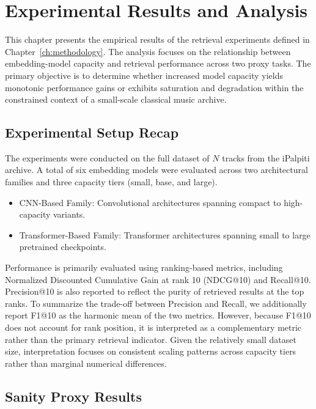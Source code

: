 \chapter{Experimental Results and Analysis}\label{ch:results}

This chapter presents the empirical results of the retrieval experiments defined in Chapter~\ref{ch:methodology}. The analysis focuses on the relationship between embedding-model capacity and retrieval performance across two proxy tasks. The primary objective is to determine whether increased model capacity yields monotonic performance gains or exhibits saturation and degradation within the constrained context of a small-scale classical music archive.

\section{Experimental Setup Recap}

The experiments were conducted on the full dataset of $N$ tracks from the iPalpiti archive. 
A total of six embedding models were evaluated across two architectural families and three capacity tiers (small, base, and large).

\begin{itemize}
    \item CNN-Based Family: Convolutional architectures spanning compact to high-capacity variants.
    \item Transformer-Based Family: Transformer architectures spanning small to large pretrained checkpoints.
\end{itemize}

Performance is primarily evaluated using ranking-based metrics, including Normalized Discounted Cumulative Gain at rank 10 (NDCG@10) and Recall@10. Precision@10 is also reported to reflect the purity of retrieved results at the top ranks. To summarize the trade-off between Precision and Recall, we additionally report F1@10 as the harmonic mean of the two metrics. However, because F1@10 does not account for rank position, it is interpreted as a complementary metric rather than the primary retrieval indicator. 
Given the relatively small dataset size, interpretation focuses on consistent scaling patterns across capacity tiers rather than marginal numerical differences.


\section{Sanity Proxy Results}

